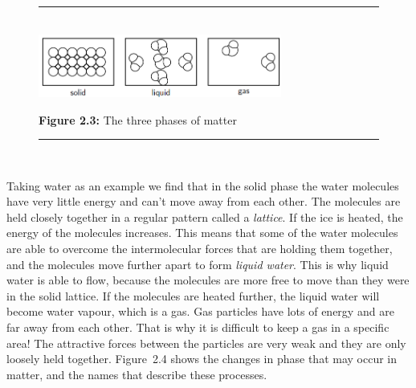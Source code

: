 	\begin{figure}[H] %
    \begin{center}
    \rule[.1in]{\figurerulewidth}{.005in} \\
        \label{m38730*uid41!!!underscore!!!media}\label{m38730*uid41!!!underscore!!!printimage}\includegraphics[width=8cm]{col11305.imgs/m38730_CG10C2_008.png} %
      \vspace{2pt}
    \vspace{\rubberspace}\par \begin{cnxcaption}
	  \small \textbf{Figure 2.3: }The three phases of matter
	\end{cnxcaption}
    \vspace{.1in}
    \rule[.1in]{\figurerulewidth}{.005in} \\
    \end{center}
 \end{figure}       
      \label{m38730*id309053}Taking water as an example we find that in the solid 
phase the water molecules have very little energy and can't move away from each 
other. The molecules are held closely together in a regular pattern called a 
\textsl{lattice}. If the ice is heated, the energy 
of the molecules increases. This means that some of the water molecules are able 
to overcome the intermolecular forces that are holding them together, and the 
molecules move further apart to form \textsl{liquid 
water}. This is why liquid water is able to flow, because the 
molecules are more free to move than they were in the solid lattice. If the 
molecules are heated further, the liquid water will become water vapour, which 
is a gas. Gas particles have lots of energy and are far away from each other. 
That is why it is difficult to keep a gas in a specific area! The attractive 
forces between the particles are very weak and they are only loosely held 
together. Figure~2.4 shows the changes in phase that may occur in 
matter, and the names that describe these processes.\par 
    \setcounter{subfigure}{0}
